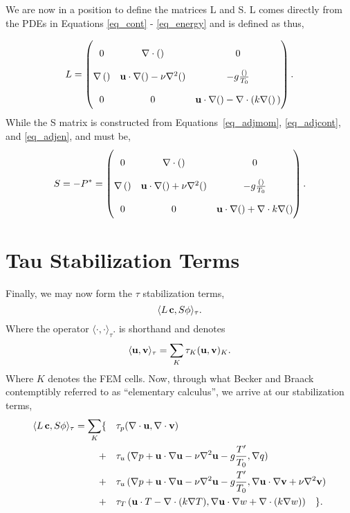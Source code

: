 We are now in a position to define the matrices L and S. L comes
directly from the PDEs in Equations \ref{eq_cont} - \ref{eq_energy} and is
defined as thus, 

\begin{equation}
\renewcommand\arraystretch{2}
 L = 
  \begin{pmatrix}
    0 & \nabla \cdot () & 0   \\
    \nabla \,() & {\bf u} \cdot \nabla() - \nu \nabla^2() & -g \frac{()}{T_0}  \\
    0 & 0 & {\bf u} \cdot \nabla() - \nabla \cdot (k \nabla() \,)
  \end{pmatrix}.
\end{equation}
%
While the S matrix is constructed from Equations~\ref{eq_adjmom},
\ref{eq_adjcont}, and \ref{eq_adjen}, and must be,  
\begin{equation}
\renewcommand\arraystretch{2}
 S = -P^* = 
  \begin{pmatrix}
    0 & \nabla \cdot () & 0   \\
    \nabla \,() & {\bf u} \cdot \nabla() + \nu \nabla^2() &  -g \frac{()}{T_0}  \\
    0 & 0 & {\bf u} \cdot \nabla() + \nabla \cdot k \nabla()
  \end{pmatrix}.
\end{equation}

%
%
\section{Tau Stabilization Terms}

Finally, we may now form the $\tau$ stabilization terms, 
\begin{equation}
 \langle L\, {\bf c},S{\bf \phi} \rangle_\tau. 
\end{equation}
Where the operator $ \langle \cdot,\cdot \rangle_\tau. $ is shorthand 
and denotes
\begin{equation}
 \langle {\bf u},{\bf v} \rangle_\tau = \sum_K \tau_K ({\bf u},{\bf v})_K.
\end{equation}
Where $K$ denotes the FEM cells. Now, through what Becker and Braack
contemptibly referred to as ``elementary calculus'', we arrive at our
stabilization terms,  
\begin{align*}
 \langle L\,{\bf c},S{\bf \phi} \rangle_\tau = \sum_K \{ \quad &\tau_p (\nabla \cdot {\bf u},
 \nabla \cdot {\bf v}) \\
 +\quad &\tau_u \,(\nabla p + {\bf u} \cdot \nabla {\bf u} - \nu
 \nabla^2 {\bf u} - g \frac{T'}{T_0},
 \nabla q) \\
 +\quad &\tau_u \, (\nabla p + {\bf u} \cdot \nabla {\bf u} - \nu \nabla^2 {\bf u}- g \frac{T'}{T_0},
 \nabla {\bf u} \cdot \nabla {\bf v} + \nu \nabla^2 {\bf v}) \\
 +\quad &\tau_T \, ({\bf u} \cdot T - \nabla \cdot (k \nabla T), \nabla {\bf u} \cdot \nabla
 w + \nabla \cdot (k \nabla w)) \quad \}.
\end{align*}

